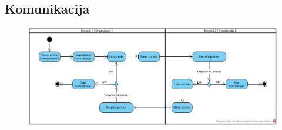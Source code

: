 \subsection{Komunikacija}

\begin{figure}[h!]
		\centerline{\includegraphics[width=\textwidth]{slike/komunikacija.jpg}}
\end{figure}

